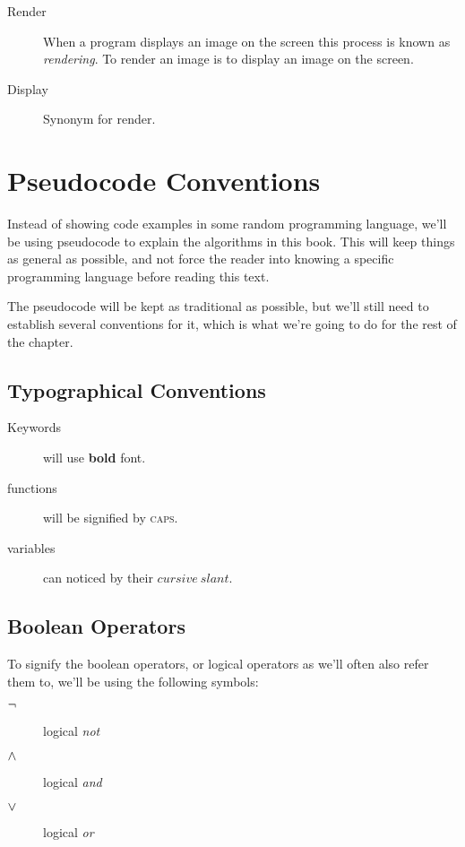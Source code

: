\begin{description}
\item[Render] When a program displays an image on the screen this
  process is known as \textit{rendering}. To render an image is to
  display an image on the screen.

\item[Display] Synonym for render.

\end{description}

\section{Pseudocode Conventions}

Instead of showing code examples in some random programming language,
we'll be using pseudocode to explain the algorithms in this book. This
will keep things as general as possible, and not force the reader into
knowing a specific programming language before reading this text.

The pseudocode will be kept as traditional as possible, but we'll
still need to establish several conventions for it, which is what
we're going to do for the rest of the chapter.

\subsection{Typographical Conventions}

\begin{description}
\item[Keywords] will use \textbf{bold} font.
\item[functions] will be signified by \textsc{caps}.
\item[variables] can noticed by their $cursive\ slant$.
\end{description}

\subsection{Boolean Operators}
\label{sec:boolean-operators}

To signify the boolean operators, or logical operators as we'll often
also refer them to, we'll be using the following symbols:

\begin{description}
\item[$\neg$] logical \textit{not}
\item[$\wedge$] logical \textit{and}
\item[$\vee$] logical \textit{or}
\end{description}


